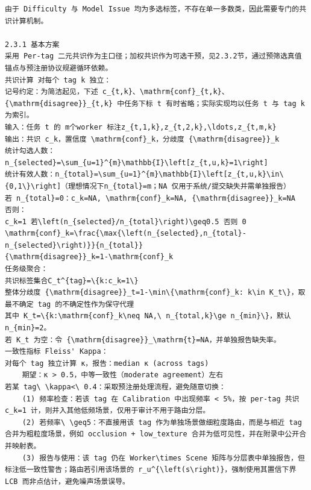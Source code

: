 \documentclass[a4paper,12pt]{article}
\begin{document}
\begin{Verbatim}[fontsize=\small,breaklines=true,breakanywhere=true]
由于 Difficulty 与 Model Issue 均为多选标签，不存在单一多数类，因此需要专门的共识计算机制。

2.3.1 基本方案
采用 Per-tag 二元共识作为主口径；加权共识作为可选干预，见2.3.2节，通过预筛选真值锚点与预注册协议规避循环依赖。
共识计算 对每个 tag k 独立：
记号约定：为简洁起见，下述 c_{t,k}、\mathrm{conf}_{t,k}、{\mathrm{disagree}}_{t,k} 中任务下标 t 有时省略；实际实现均以任务 t 与 tag k 为索引。
输入：任务 t 的 m个worker 标注z_{t,1,k},z_{t,2,k},\ldots,z_{t,m,k}
输出：共识 c_k，置信度 \mathrm{conf}_k，分歧度 {\mathrm{disagree}}_k
统计勾选人数：n_{selected}=\sum_{u=1}^{m}\mathbb{I}\left[z_{t,u,k}=1\right]
统计有效人数：n_{total}=\sum_{u=1}^{m}\mathbb{I}\left[z_{t,u,k}\in\{0,1\}\right]（理想情况下n_{total}=m；NA 仅用于系统/提交缺失并需单独报告）
若 n_{total}=0：c_k=NA, \mathrm{conf}_k=NA, {\mathrm{disagree}}_k=NA
否则：
c_k=1 若\left(n_{selected}/n_{total}\right)\geq0.5 否则 0
\mathrm{conf}_k=\frac{\max{\left(n_{selected},n_{total}-n_{selected}\right)}}{n_{total}}
{\mathrm{disagree}}_k=1-\mathrm{conf}_k
任务级聚合：
共识标签集合C_t^{tag}=\{k:c_k=1\}
整体分歧度 {\mathrm{disagree}}_t=1-\min\{\mathrm{conf}_k: k\in K_t\}，取最不确定 tag 的不确定性作为保守代理
其中 K_t=\{k:\mathrm{conf}_k\neq NA,\ n_{total,k}\ge n_{min}\}，默认 n_{min}=2。
若 K_t 为空：令 {\mathrm{disagree}}_\mathrm{t}=NA，并单独报告缺失率。
一致性指标 Fleiss' Kappa：
对每个 tag 独立计算 κ，报告：median κ (across tags)
	期望：κ > 0.5，中等一致性（moderate agreement）左右
若某 tag\ \kappa<\ 0.4：采取预注册处理流程，避免随意切换：
	(1) 频率检查：若该 tag 在 Calibration 中出现频率 < 5%，按 per-tag 共识 c_k=1 计，则并入其他低频场景，仅用于审计不用于路由分层。
	(2) 若频率\ \geq5：不直接用该 tag 作为单独场景做细粒度路由，而是与相近 tag 合并为粗粒度场景，例如 occlusion + low_texture 合并为低可见性，并在附录中公开合并映射表。
	(3) 报告与使用：该 tag 仍在 Worker\times Scene 矩阵与分层表中单独报告，但标注低一致性警告；路由若引用该场景的 r_u^{\left(s\right)}，强制使用其置信下界 LCB 而非点估计，避免噪声场景误导。


\end{Verbatim}
\end{document}
